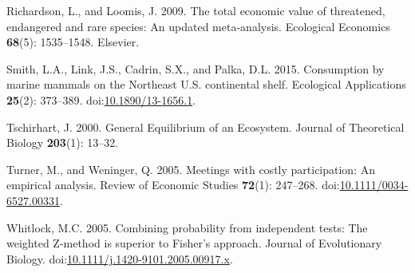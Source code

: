 \documentclass[]{article}
\begin{document}
\hypertarget{ref-richardson2009total}{}
Richardson, L., and Loomis, J. 2009. The total economic value of
threatened, endangered and rare species: An updated meta-analysis.
Ecological Economics \textbf{68}(5): 1535--1548. Elsevier.

\hypertarget{ref-smith_consumption_2015}{}
Smith, L.A., Link, J.S., Cadrin, S.X., and Palka, D.L. 2015. Consumption
by marine mammals on the Northeast U.S. continental shelf. Ecological
Applications \textbf{25}(2): 373--389.
doi:\href{https://doi.org/10.1890/13-1656.1}{10.1890/13-1656.1}.

\hypertarget{ref-Tschirhart2000GeneralEcosystem}{}
Tschirhart, J. 2000. General Equilibrium of an Ecosystem. Journal of
Theoretical Biology \textbf{203}(1): 13--32.

\hypertarget{ref-Turner2005MeetingsAnalysis}{}
Turner, M., and Weninger, Q. 2005. Meetings with costly participation:
An empirical analysis. Review of Economic Studies \textbf{72}(1):
247--268.
doi:\href{https://doi.org/10.1111/0034-6527.00331}{10.1111/0034-6527.00331}.

\hypertarget{ref-Whitlock2005CombiningApproach}{}
Whitlock, M.C. 2005. Combining probability from independent tests: The
weighted Z-method is superior to Fisher's approach. Journal of
Evolutionary Biology.
doi:\href{https://doi.org/10.1111/j.1420-9101.2005.00917.x}{10.1111/j.1420-9101.2005.00917.x}.
\end{document}
